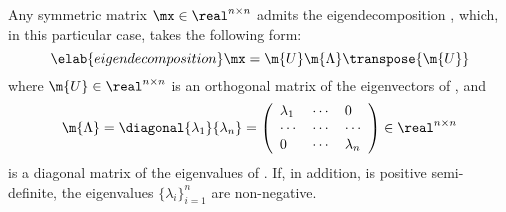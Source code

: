Any symmetric matrix $\mx \in \real^{n \times n}$ admits the eigendecomposition
\cite{press2007}, which, in this particular case, takes the following form:
\begin{equation} \elab{eigendecomposition}
  \mx = \m{U} \m{\Lambda} \transpose{\m{U}}
\end{equation}
where $\m{U} \in \real^{n \times n}$ is an orthogonal matrix of the eigenvectors
of \mx, and
\[
  \m{\Lambda} = \diagonal{\lambda_1}{\lambda_n} = \left(
    \begin{array}{lll}
      \lambda_1 & \cdots & 0         \\
      \cdots    & \cdots & \cdots    \\
      0         & \cdots & \lambda_n
    \end{array}
  \right) \in \real^{n \times n}
\]
is a diagonal matrix of the eigenvalues of \mx. If, in addition, \mx is positive
semi-definite, the eigenvalues $\{ \lambda_i \}_{i = 1}^n$ are non-negative.
